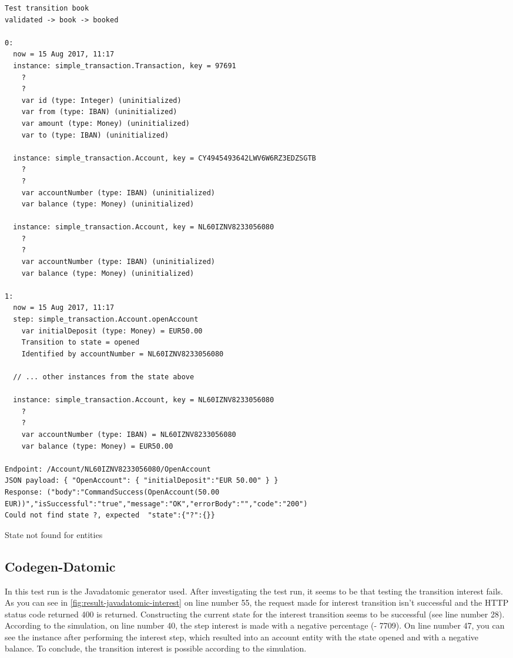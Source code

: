 \begin{sourcecode}[h!]
\begin{lstlisting}[]
Test transition book
validated -> book -> booked

0:
  now = 15 Aug 2017, 11:17
  instance: simple_transaction.Transaction, key = 97691
    ?
    ?
    var id (type: Integer) (uninitialized)
    var from (type: IBAN) (uninitialized)
    var amount (type: Money) (uninitialized)
    var to (type: IBAN) (uninitialized)

  instance: simple_transaction.Account, key = CY4945493642LWV6W6RZ3EDZSGTB
    ?
    ?
    var accountNumber (type: IBAN) (uninitialized)
    var balance (type: Money) (uninitialized)

  instance: simple_transaction.Account, key = NL60IZNV8233056080
    ?
    ?
    var accountNumber (type: IBAN) (uninitialized)
    var balance (type: Money) (uninitialized)

1:
  now = 15 Aug 2017, 11:17
  step: simple_transaction.Account.openAccount
    var initialDeposit (type: Money) = EUR50.00
    Transition to state = opened
    Identified by accountNumber = NL60IZNV8233056080

  // ... other instances from the state above

  instance: simple_transaction.Account, key = NL60IZNV8233056080
    ?
    ?
    var accountNumber (type: IBAN) = NL60IZNV8233056080
    var balance (type: Money) = EUR50.00

Endpoint: /Account/NL60IZNV8233056080/OpenAccount
JSON payload: { "OpenAccount": { "initialDeposit":"EUR 50.00" } }
Response: ("body":"CommandSuccess(OpenAccount(50.00 EUR))","isSuccessful":"true","message":"OK","errorBody":"","code":"200")
Could not find state ?, expected  "state":{"?":{}}
\end{lstlisting}
\caption{State not found for entities}
\label{fig:result-not-found-state}
\end{sourcecode}

\subsection{Codegen-Datomic}\label{sec:bug-interest-javadatomic}

In this test run is the Javadatomic generator used. After investigating the test
run, it seems to be that testing the transition interest fails. As you can see
in \autoref{fig:result-javadatomic-interest} on line number 55, the request made
for interest transition isn't successful and the HTTP status code returned 400
is returned. Constructing the current state for the interest transition seems to
be successful (see line number 28). According to the simulation, on line number
40, the step interest is made with a negative percentage (- 7709). On line
number 47, you can see the instance after performing the interest step, which
resulted into an account entity with the state opened and with a negative
balance. To conclude, the transition interest is possible according to the
simulation.

